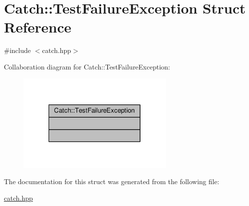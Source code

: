 \hypertarget{struct_catch_1_1_test_failure_exception}{\section{Catch\-:\-:Test\-Failure\-Exception Struct Reference}
\label{struct_catch_1_1_test_failure_exception}
}


{\ttfamily \#include $<$catch.\-hpp$>$}



Collaboration diagram for Catch\-:\-:Test\-Failure\-Exception\-:
\nopagebreak
\begin{figure}[H]
\begin{center}
\leavevmode
\includegraphics[width=220pt]{struct_catch_1_1_test_failure_exception__coll__graph}
\end{center}
\end{figure}


The documentation for this struct was generated from the following file\-:\begin{DoxyCompactItemize}
\item 
\hyperlink{catch_8hpp}{catch.\-hpp}\end{DoxyCompactItemize}
